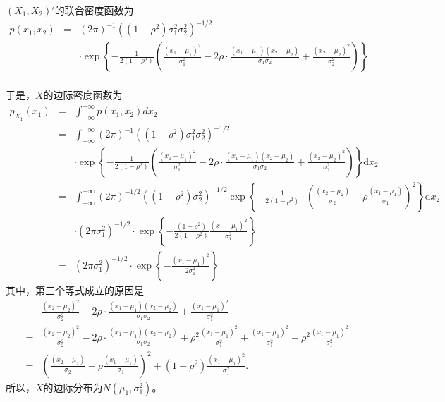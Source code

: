 \begin{solution}
$(X_1,X_2)'$的联合密度函数为
\begin{eqnarray*}
    p(x_1,x_2)&=&(2 \pi)^{-1} \left((1-\rho^2) \sigma_1^2\sigma_2^2\right)^{-1/2}\\
           &&\cdot
            \exp\left\{
           -\frac{1}{2(1-\rho^2)} \left(\frac{(x_1 -\mu_1)^2}{\sigma_1^2} - 2\rho \cdot \frac{(x_1 -\mu_1)(x_2-\mu_2)}{\sigma_1\sigma_2} + \frac{(x_2 -\mu_2)^2}{\sigma_2^2}
           \right)
           \right\}\\
\end{eqnarray*}

于是，$X$的边际密度函数为
\begin{eqnarray*}
    p_{X_1}(x_1) &=&\int_{-\infty}^{+\infty} p(x_1, x_2) d x_2 \\
    &=&\int_{-\infty}^{+\infty}(2 \pi)^{-1} \left((1-\rho^2) \sigma_1^2\sigma_2^2\right)^{-1/2}\\
           &&\cdot
            \exp\left\{
           -\frac{1}{2(1-\rho^2)} \left(\frac{(x_1 -\mu_1)^2}{\sigma_1^2} - 2\rho \cdot \frac{(x_1 -\mu_1)(x_2-\mu_2)}{\sigma_1\sigma_2} + \frac{(x_2 -\mu_2)^2}{\sigma_2^2}
           \right)
           \right\} \text{d} x_2  \\
           &=& 
           \int_{-\infty}^{+\infty} (2 \pi)^{-1/2} \left((1-\rho^2) \sigma_2^2\right)^{-1/2}
           \exp\left\{ -\frac{1}{2(1-\rho^2)}\cdot 
           \left( \frac{(x_2 -\mu_2)}{\sigma_2} - \rho \frac{(x_1 -\mu_1)}{\sigma_1}  \right)^2 \right\} \text{d} x_2 \\
           &&\cdot (2\pi \sigma_1^2)^{-1/2}\cdot \exp\left\{ -\frac{(1-\rho^2)}{2(1-\rho^2)} \frac{(x_1 -\mu_1)^2}{\sigma_1^2}
           \right\} \\
           &=&(2\pi \sigma_1^2)^{-1/2}\cdot \exp\left\{ - \frac{(x_1 -\mu_1)^2}{2\sigma_1^2}
           \right\}
\end{eqnarray*}
其中，第三个等式成立的原因是
\begin{eqnarray*}
  && \frac{(x_2 -\mu_2)^2}{\sigma_2^2} -  2\rho \cdot \frac{(x_1 -\mu_1)(x_2-\mu_2)}{\sigma_1\sigma_2} +\frac{(x_1 -\mu_1)^2}{\sigma_1^2} \\
&=& \frac{(x_2 -\mu_2)^2}{\sigma_2^2} -  2\rho \cdot \frac{(x_1 -\mu_1)(x_2-\mu_2)}{\sigma_1\sigma_2} + \rho^2\frac{(x_1 -\mu_1)^2}{\sigma_1^2} + \frac{(x_1 -\mu_1)^2}{\sigma_1^2} - \rho^2\frac{(x_1 -\mu_1)^2}{\sigma_1^2}\\
&=& \left( \frac{(x_2 -\mu_2)}{\sigma_2} - \rho \frac{(x_1 -\mu_1)}{\sigma_1}  \right)^2 + (1-\rho^2) \frac{(x_1 -\mu_1)^2}{\sigma_1^2}.
\end{eqnarray*}
所以，$X$的边际分布为$N(\mu_1,\sigma_1^2)$。
\end{solution}

